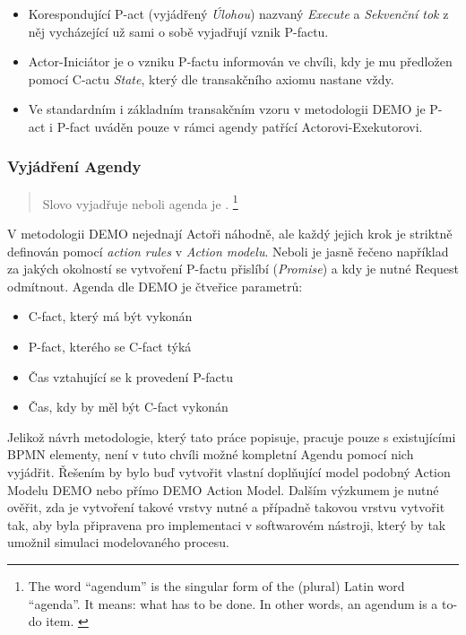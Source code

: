 \documentclass[]{article}
\begin{document}
\begin{itemize}
\item Korespondující P-act (vyjádřený \textit{Úlohou}) nazvaný \textit{Execute} a \textit{Sekvenční tok} z něj vycházející už sami o sobě vyjadřují vznik P-factu.
\item Actor-Iniciátor je o vzniku P-factu informován ve chvíli, kdy je mu předložen pomocí C-actu \textit{State}, který dle transakčního axiomu nastane vždy.
\item Ve standardním i základním transakčním vzoru v metodologii DEMO je P-act i P-fact uváděn pouze v rámci agendy patřící Actorovi-Exekutorovi.
\end{itemize}

\subsubsection{Vyjádření Agendy}

\begin{quote}
Slovo  vyjadřuje  neboli agenda je . \cite{Dietz2006}
\footnote{The word “agendum” is the singular form of the (plural) Latin word “agenda”. It means: what has to be done. In other words, an agendum is a to-do item. \cite{Dietz2006}}
\end{quote}

V metodologii DEMO nejednají Actoři náhodně, ale každý jejich krok je striktně definován pomocí \textit{action rules} v \textit{Action modelu}. Neboli je jasně řečeno například za jakých okolností se vytvoření P-factu přislíbí (\textit{Promise}) a kdy je nutné Request odmítnout. Agenda dle DEMO je čtveřice parametrů:

\begin{itemize}
\item C-fact, který má být vykonán
\item P-fact, kterého se C-fact týká
\item Čas vztahující se k provedení P-factu
\item Čas, kdy by měl být C-fact vykonán %
\end{itemize}

Jelikož návrh metodologie, který tato práce popisuje, pracuje pouze s existujícími BPMN elementy, není v tuto chvíli možné kompletní Agendu pomocí nich vyjádřit. Řešením by bylo buď vytvořit vlastní doplňující model podobný Action Modelu DEMO nebo přímo DEMO Action Model. Dalším výzkumem je nutné ověřit, zda je vytvoření takové vrstvy nutné a případně takovou vrstvu vytvořit tak, aby byla připravena pro implementaci v softwarovém nástroji, který by tak umožnil simulaci modelovaného procesu.
\end{document}

